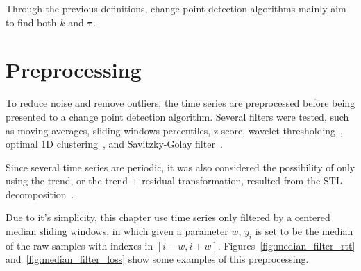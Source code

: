 Through the previous definitions, change point detection algorithms mainly aim
to find both $k$ and $\boldsymbol \tau$.

\section{Preprocessing}

To reduce noise and remove outliers, the time series are
preprocessed before being presented to a change point detection algorithm.
Several filters were tested, such as moving averages, sliding windows
percentiles, z-score,
wavelet thresholding~\cite{an_introduction_to_wavelets}, optimal 1D
clustering~\cite{ckmeans_1d_dp_optimal_k_means_clustering_in_one_dimension_by_dynamic_programming},
and Savitzky-Golay filter~\cite{savgol}.

Since several time series are
periodic, it was also considered the possibility of only using the
trend, or the trend + residual transformation,
resulted from the STL
decomposition~\cite{stl_a_seasonal_trend_decomposition_procedure_based_on_loess}.

Due to it's simplicity,
this chapter use time series only filtered by a centered median
sliding windows, in which given a parameter $w$, $y_{i}$ is set to be
the median of the raw samples with indexes in $[i-w, i+w]$.
Figures~\ref{fig:median_filter_rtt} and~\ref{fig:median_filter_loss} show
some examples of this preprocessing.

